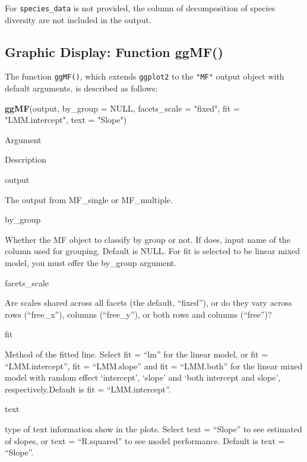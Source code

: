 \documentclass[
]{article}
\newenvironment{Shaded}{\begin{snugshade}}{\end{snugshade}}
\newcommand{\AttributeTok}[1]{\textcolor[rgb]{0.13,0.29,0.53}{#1}}
\newcommand{\ConstantTok}[1]{\textcolor[rgb]{0.56,0.35,0.01}{#1}}
\newcommand{\FunctionTok}[1]{\textcolor[rgb]{0.13,0.29,0.53}{\textbf{#1}}}
\newcommand{\NormalTok}[1]{#1}
\newcommand{\StringTok}[1]{\textcolor[rgb]{0.31,0.60,0.02}{#1}}
\begin{document}
For \texttt{species\_data} is not provided, the column of decomposition
of species diversity are not included in the output.

\hypertarget{graphic-display-function-ggmf}{%
\subsection{Graphic Display: Function
ggMF()}\label{graphic-display-function-ggmf}}

The function \texttt{ggMF()}, which extends \texttt{ggplot2} to the
\texttt{"MF"} output object with default arguments, is described as
follows:

\begin{Shaded}
\begin{Highlighting}[]
\FunctionTok{ggMF}\NormalTok{(output, }\AttributeTok{by\_group =} \ConstantTok{NULL}\NormalTok{, }\AttributeTok{facets\_scale =} \StringTok{"fixed"}\NormalTok{, }
                 \AttributeTok{fit =} \StringTok{"LMM.intercept"}\NormalTok{, }\AttributeTok{text =} \StringTok{"Slope"}\NormalTok{)}
\end{Highlighting}
\end{Shaded}

Argument

Description

output

The output from MF\_single or MF\_multiple.

by\_group

Whether the MF object to classify by group or not. If does, input name
of the column used for grouping. Default is NULL. For fit is selected to
be linear mixed model, you must offer the by\_group argument.

facets\_scale

Are scales shared across all facets (the default, ``fixed''), or do they
vary across rows (``free\_x''), columns (``free\_y''), or both rows and
columns (``free'')?

fit

Method of the fitted line. Select fit = ``lm'' for the linear model, or
fit = ``LMM.intercept'', fit = ``LMM.slope'' and fit = ``LMM.both'' for
the linear mixed model with random effect `intercept', `slope' and `both
intercept and slope', respectively.Default is fit = ``LMM.intercept''.

text

type of text information show in the plots. Select text = ``Slope'' to
see estimated of slopes, or text = ``R.squared'' to see model
performance. Default is text = ``Slope''.
\end{document}
